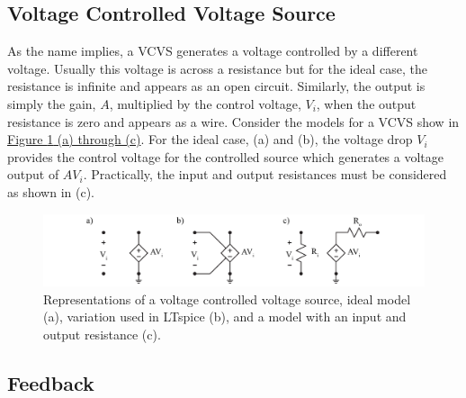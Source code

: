 \subsection{Voltage Controlled Voltage Source}

As the name implies, a VCVS generates a voltage controlled by a different voltage. Usually this voltage is across a resistance but for the ideal case, the resistance is infinite and appears as an open circuit. Similarly, the output is simply the gain, $A$, multiplied by the control voltage, $V_i$, when the output resistance is zero and appears as a wire. Consider the models for a VCVS show in \hyperref[fig:4sourcemodel]{Figure \ref*{fig:4sourcemodel} (a) through (c)}. For the ideal case, (a) and (b), the voltage drop $V_i$ provides the control voltage for the controlled source which generates a voltage output of $A V_i$. Practically, the input and output resistances must be considered as shown in (c). 

\begin{figure} [h]
	\centering
		\includegraphics[width=1\textwidth]{Lab4AidealSource.pdf}
	\caption{Representations of a voltage controlled voltage source, ideal model (a), variation used in LTspice (b), and a model with an input and output resistance (c).} \label{fig:4sourcemodel}
\end{figure}




\subsection{Feedback}

